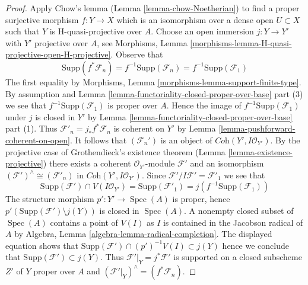 \documentclass{stacks-project}
\theoremstyle{plain}
\theoremstyle{definition}
\theoremstyle{remark}
\numberwithin{equation}{subsection}
\def\Spec{\mathop{\mathrm{Spec}}}
\begin{document}
\begin{proof}
\medskip\noindent
Apply Chow's lemma (Lemma \ref{lemma-chow-Noetherian}) to find a
proper surjective morphism $f : Y \to X$ which is an isomorphism
over a dense open $U \subset X$ such that $Y$ is H-quasi-projective
over $A$. Choose an open immersion $j : Y \to Y'$ with
$Y'$ projective over $A$, see
Morphisms, Lemma \ref{morphisms-lemma-H-quasi-projective-open-H-projective}.
Observe that
$$
\text{Supp}(f^*\mathcal{F}_n) = f^{-1}\text{Supp}(\mathcal{F}_n) =
f^{-1}\text{Supp}(\mathcal{F}_1)
$$
The first equality by
Morphisms, Lemma \ref{morphisms-lemma-support-finite-type}.
By assumption and
Lemma \ref{lemma-functoriality-closed-proper-over-base} part (3)
we see that $f^{-1}\text{Supp}(\mathcal{F}_1)$ is proper over $A$.
Hence the image of $f^{-1}\text{Supp}(\mathcal{F}_1)$
under $j$ is closed in $Y'$ by
Lemma \ref{lemma-functoriality-closed-proper-over-base} part (1).
Thus $\mathcal{F}'_n = j_*f^*\mathcal{F}_n$ is coherent on
$Y'$ by Lemma \ref{lemma-pushforward-coherent-on-open}.
It follows that $(\mathcal{F}_n')$
is an object of $\textit{Coh}(Y', I\mathcal{O}_{Y'})$.
By the projective case of Grothendieck's existence theorem
(Lemma \ref{lemma-existence-projective})
there exists a coherent $\mathcal{O}_{Y'}$-module
$\mathcal{F}'$ and an isomorphism
$(\mathcal{F}')^\wedge \cong (\mathcal{F}'_n)$ in
$\textit{Coh}(Y', I\mathcal{O}_{Y'})$.
Since $\mathcal{F}'/I\mathcal{F}' = \mathcal{F}'_1$ we see that
$$
\text{Supp}(\mathcal{F}') \cap V(I\mathcal{O}_{Y'}) =
\text{Supp}(\mathcal{F}'_1) = j(f^{-1}\text{Supp}(\mathcal{F}_1))
$$
The structure morphism $p' : Y' \to \Spec(A)$ is proper, hence
$p'(\text{Supp}(\mathcal{F}') \setminus j(Y))$
is closed in $\Spec(A)$. A nonempty closed subset of $\Spec(A)$
contains a point of $V(I)$ as $I$ is contained in the Jacobson radical
of $A$ by Algebra, Lemma \ref{algebra-lemma-radical-completion}.
The displayed equation shows that
$\text{Supp}(\mathcal{F}') \cap (p')^{-1}V(I) \subset j(Y)$
hence we conclude that $\text{Supp}(\mathcal{F}') \subset j(Y)$.
Thus $\mathcal{F}'|_Y = j^*\mathcal{F}'$
is supported on a closed subscheme $Z'$ of $Y$ proper over $A$
and $(\mathcal{F}'|_Y)^\wedge = (f^*\mathcal{F}_n)$.


\end{proof}
\end{document}
